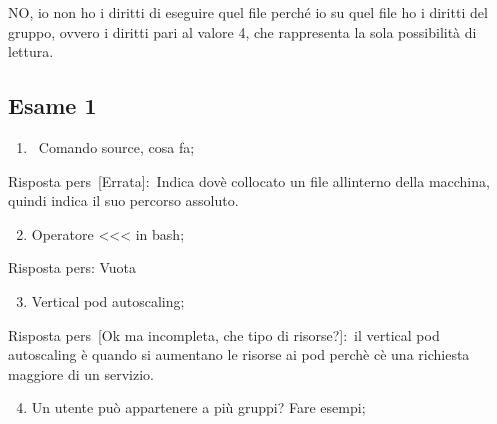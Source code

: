 \documentclass[
]{article}
\providecommand{\tightlist}{%
  \setlength{\itemsep}{0pt}\setlength{\parskip}{0pt}}
\begin{document}
{}

{NO, io non ho i diritti di eseguire quel file perché io su quel file ho
i diritti del gruppo, ovvero i diritti pari al valore 4, che rappresenta
la sola possibilità di lettura.}

{}

{}

\subsection{\texorpdfstring{{Esame 1}}{Esame 1}}\label{h.9by5o2qx7hz}

\begin{enumerate}
\tightlist
\item
  {~Comando source, cosa fa;}
\end{enumerate}

{}

{Risposta pers}{~}{{[}Errata{]}}{:}{~Indica dov\textquotesingle è
collocato un file all\textquotesingle interno della macchina, quindi
indica il suo percorso assoluto.}

{}

{}

\begin{enumerate}
\setcounter{enumi}{1}
\tightlist
\item
  {Operatore \textless\textless\textless{} in bash;}
\end{enumerate}

{}

{Risposta pers}{: }{Vuota}

{}

\begin{enumerate}
\setcounter{enumi}{2}
\tightlist
\item
  {Vertical pod autoscaling;}
\end{enumerate}

{}

{Risposta }{pers}{~}{{[}Ok ma incompleta, che tipo di
risorse?{]}}{:}{~}{il vertical pod autoscaling è quando si aumentano le
risorse ai pod perchè c\textquotesingle è una richiesta maggiore di un
servizio.}

{}

{}

\begin{enumerate}
\setcounter{enumi}{3}
\tightlist
\item
  {Un utente può appartenere a più gruppi? Fare esempi;}
\end{enumerate}

{}
\end{document}
